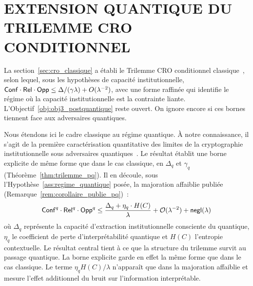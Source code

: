 
\section{EXTENSION QUANTIQUE DU TRILEMME CRO CONDITIONNEL}
\label{sec:cro_pq}
\begin{sloppypar}
La section~\ref{sec:cro_classique} a \'etabli le Trilemme CRO conditionnel
classique~\cite{MINKA2026CRO}, selon lequel, sous les hypoth\`eses de capacit\'e institutionnelle,
$\mathsf{Conf} \cdot \mathsf{Rel} \cdot \mathsf{Opp} \leq \Delta/(\gamma\lambda) + O(\lambda^{-2})$, avec une
forme raffin\'ee qui identifie le r\'egime o\`u la capacit\'e institutionnelle est la
contrainte liante. L'Objectif~\ref{obj:obj3_postquantique} reste ouvert. On ignore encore si ces bornes
tiennent face aux adversaires quantiques.

Nous \'etendons ici le cadre classique au r\'egime quantique.
\`A notre connaissance, il s'agit de la premi\`ere caract\'erisation quantitative des limites
de la cryptographie institutionnelle sous adversaires quantiques~\cite{NISTPQC,Zhandry}.
Le r\'esultat \'etablit une borne explicite de m\^eme forme que dans le cas classique, en
$\Delta_q$ et $\gamma_q$ (Th\'eor\`eme~\ref{thm:trilemme_pq}). Il en d\'ecoule, sous
l'Hypoth\`ese~\ref{ass:regime_quantique} pos\'ee, la majoration affaiblie publi\'ee
(Remarque~\ref{rem:corollaire_publie_pq})~:
\begin{equation}
\mathsf{Conf}^q \cdot \mathsf{Rel}^q \cdot \mathsf{Opp}^q \leq \frac{\Delta_q + \eta_q \cdot H(C)}{\lambda}
+ \mathcal{O}(\lambda^{-2}) + \mathsf{negl}(\lambda)
\label{eq:cro_pq_borne_principale}
\end{equation}
o\`u $\Delta_q$ repr\'esente la capacit\'e d'extraction institutionnelle
consciente du quantique, $\eta_q$ le coefficient de perte d'interpr\'etabilit\'e
quantique et $H(C)$ l'entropie contextuelle. Le r\'esultat central tient \`a ce que la
structure du trilemme survit au passage quantique. La borne explicite garde en effet la m\^eme
forme que dans le cas classique. Le terme $\eta_q H(C)/\lambda$ n'appara\^it que
dans la majoration affaiblie et mesure l'effet additionnel du bruit sur
l'information interpr\'etable.


\end{sloppypar}
